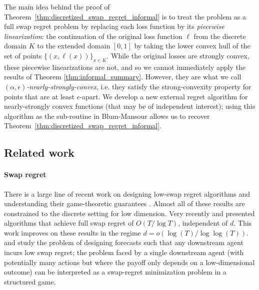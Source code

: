 \documentclass[final,12pt]{alt2025}
\begin{document}
The main idea behind the proof of Theorem~\ref{thm:discretized_swap_regret_informal} is to treat the problem as a full swap regret problem by replacing each loss function by its \emph{piecewise linearization}: the continuation of the original loss function $\ell$ from the discrete domain $K$ to the extended domain $[0, 1]$ by taking the lower convex hull of the set of points $\{(x, \ell(x))\}_{x \in K}$. While the original losses are strongly convex, these piecewise linearizations are not, and so we cannot immediately apply the results of Theorem \ref{thm:informal_summary}. However, they are what we call \emph{$(\alpha, \epsilon)$-nearly-strongly-convex}, i.e. they satisfy the strong-convexity property for points that are at least $\epsilon$-apart. We develop a new external regret algorithm for nearly-strongly convex functions (that may be of independent interest); using this algorithm as the sub-routine in Blum-Mansour allows us to recover Theorem~\ref{thm:discretized_swap_regret_informal}.

\subsection{Related work}

\paragraph{Swap regret} There is a large line of recent work on designing low-swap regret algorithms and understanding their game-theoretic guarantees \citep{braverman2018selling, deng2019prior, deng2019strategizing, camara2020mechanisms, mansour2022strategizing, cai2023selling, brown2024learning, haghtalab2024calibrated}. Almost all of these results are constrained to the discrete setting for low dimension. Very recently  \cite{dagan2023external} and \cite{peng2023fast} presented algorithms that achieve full swap regret of $O(T/\log T)$, independent of $d$. This work improves on these results in the regime $d = o(\log(T)/\log\log(T))$. \cite{roth2024forecasting} and \cite{hu2024calibrationerrordecisionmaking} study the problem of designing forecasts such that any downstream agent incurs low swap regret; the problem faced by a single downstream agent (with potentially many actions but where the payoff only depends on a low-dimensional outcome) can be interpreted as a swap-regret minimization problem in a structured game. 
\end{document}
